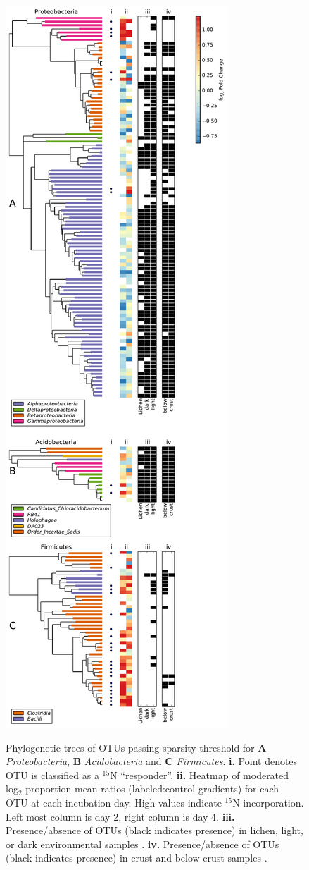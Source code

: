 \begin{figure}[H]
  \centering
  \caption{Phylogenetic trees of OTUs passing sparsity threshold for \textbf{A}
  \textit{Proteobacteria}, \textbf{B} \textit{Acidobacteria} and \textbf{C}
  \textit{Firmicutes}. \textbf{i.} Point denotes OTU is classified as a $^{15}$N
  ``responder''. \textbf{ii.} Heatmap of moderated log$_{2}$ proportion mean
  ratios (labeled:control gradients) for each OTU at each incubation day. High
  values indicate $^{15}$N incorporation. Left most column is day 2, right column
  is day 4. \textbf{iii.} Presence/absence of OTUs
  (black indicates presence) in lichen, light, or dark environmental samples
  \citep{Garcia_Pichel_2013}. \textbf{iv.} Presence/absence of OTUs (black
  indicates presence) in crust and below crust samples \citep{Steven_2013}.}
  \includegraphics[height=0.95\textheight]{figures/trees/trees.pdf}
    \label{fig:trees}
\end{figure}

